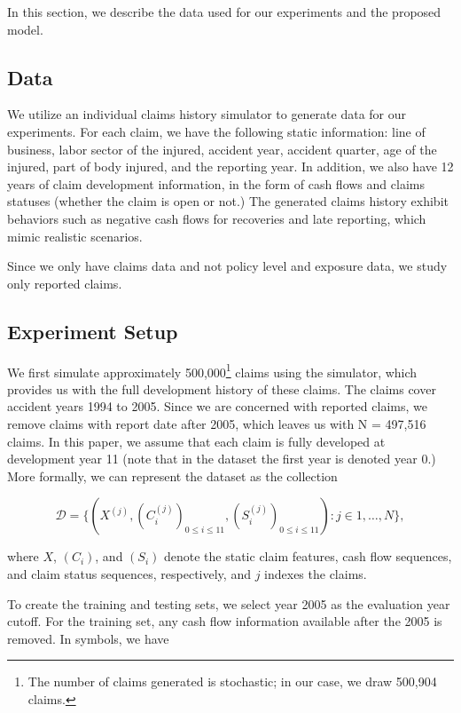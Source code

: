 \documentclass{article}
\begin{document}
In this section, we describe the data used for our experiments and the proposed model.

\subsection{Data}

We utilize an individual claims history simulator \cite{gabrielli2018individual} to generate data for our experiments. For each claim, we have the following static information: line of business, labor sector of the injured, accident year, accident quarter, age of the injured, part of body injured, and the reporting year. In addition, we also have 12 years of claim development information, in the form of cash flows and claims statuses (whether the claim is open or not.) The generated claims history exhibit behaviors such as negative cash flows for recoveries and late reporting, which mimic realistic scenarios.

Since we only have claims data and not policy level and exposure data, we study only reported claims.

\subsection{Experiment Setup}

We first simulate approximately 500,000\footnote{The number of claims generated is stochastic; in our case, we draw 500,904 claims.} claims using the simulator, which provides us with the full development history of these claims. The claims cover accident years 1994 to 2005. Since we are concerned with reported claims, we remove claims with report date after 2005, which leaves us with N = 497,516 claims. In this paper, we assume that each claim is fully developed at development year 11 (note that in the dataset the first year is denoted year 0.) More formally, we can represent the dataset as the collection

\begin{equation}
    \mathcal{D} = \{ (X^{(j)}, (C_i^{(j)})_{0 \leq i \leq 11}, (S_i^{(j)})_{0 \leq i \leq 11}): j\in {1,\dots, N}\},
\end{equation}

where $X$, $(C_i)$, and $(S_i)$ denote the static claim features, cash flow sequences, and claim status sequences, respectively, and $j$ indexes the claims.

To create the training and testing sets, we select year 2005 as the evaluation year cutoff. For the training set, any cash flow information available after the 2005 is removed. In symbols, we have
\end{document}

